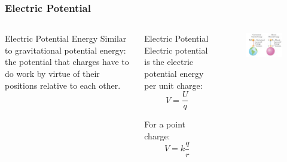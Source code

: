 \documentclass{beamer}
\begin{document}
\begin{frame}
    \frametitle{Electric Potential}
    \begin{columns}
        \begin{block}{Electric Potential Energy}
            Similar to gravitational potential energy: the potential that charges have to do work by virtue of their positions relative to each other.
        \end{block}
        
        \begin{block}{Electric Potential}
            Electric potential is the electric potential energy per unit charge:
            \begin{equation}
                V = \frac{U}{q}
            \end{equation}
            
            For a point charge:
            \begin{equation}
                V = k\frac{q}{r}
            \end{equation}
        \end{block}
        
        \begin{alertblock}{ }
            \begin{figure}
                \centering
                \includegraphics[width=1\linewidth]{phys11-electrostatics-electric-potential-point-charge.png}
            \end{figure}
        \end{alertblock}
    \end{columns}
\end{frame}
\end{document}
